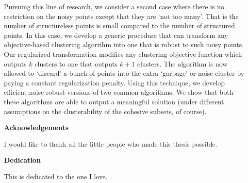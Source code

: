 \documentclass[letterpaper,12pt,titlepage,oneside,final]{book}
\let\origdoublepage\cleardoublepage
\newcommand{\clearemptydoublepage}{%
  \clearpage{\pagestyle{empty}\origdoublepage}}
\let\cleardoublepage\clearemptydoublepage
\begin{document}
Pursuing this line of research, we consider a second case where there is no restriction on the noisy points except that they are `not too many'. That is the number of structureless points is small compared to the number of structured points. In this case, we develop a generic procedure that can transform any objective-based clustering algorithm into one that is robust to such noisy points. Our regularized transformation modifies any clustering objective function which outputs $k$ clusters to one that outputs $k+1$ clusters. The algorithm is now allowed to ‘discard’ a bunch of points into the extra ‘garbage’ or noise cluster by paying a constant regularization penalty. Using this technique, we develop efficient noise-robust versions of two common algorithms. We show that both these algorithms are able to output a meaningful solution (under different assumptions on the clusterability of the cohesive subsets, of course).    

\cleardoublepage

\begin{center}\textbf{Acknowledgements}\end{center}

I would like to thank all the little people who made this thesis possible.
\cleardoublepage

\begin{center}\textbf{Dedication}\end{center}

This is dedicated to the one I love.
\cleardoublepage

\renewcommand\contentsname{Table of Contents}
\tableofcontents
\cleardoublepage
{}    %

\listoftables
\cleardoublepage
{}		%

\listoffigures
\cleardoublepage
{}		%

{}		%


\ifdefined\COMPLETE
\else
\end{document}
